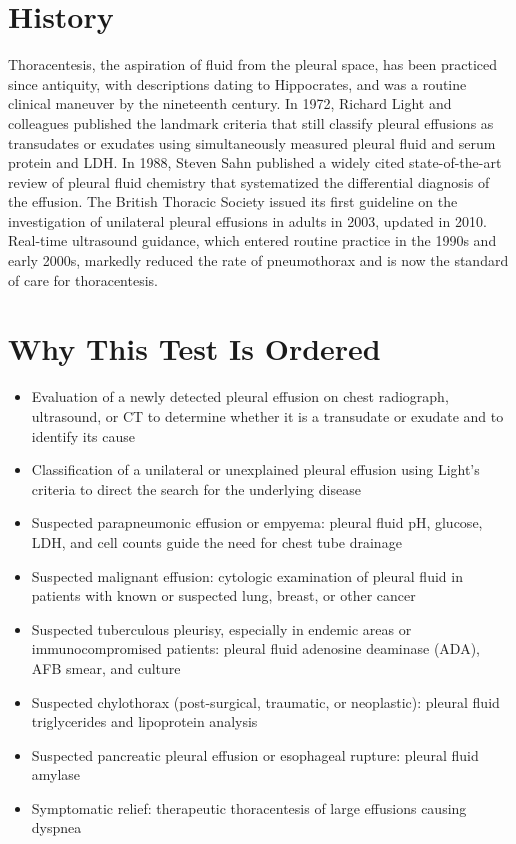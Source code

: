 \section*{History}
Thoracentesis, the aspiration of fluid from the pleural space, has been practiced since antiquity, with descriptions dating to Hippocrates, and was a routine clinical maneuver by the nineteenth century. In 1972, Richard Light and colleagues published the landmark criteria that still classify pleural effusions as transudates or exudates using simultaneously measured pleural fluid and serum protein and LDH. In 1988, Steven Sahn published a widely cited state-of-the-art review of pleural fluid chemistry that systematized the differential diagnosis of the effusion. The British Thoracic Society issued its first guideline on the investigation of unilateral pleural effusions in adults in 2003, updated in 2010. Real-time ultrasound guidance, which entered routine practice in the 1990s and early 2000s, markedly reduced the rate of pneumothorax and is now the standard of care for thoracentesis.
\section*{Why This Test Is Ordered}
\begin{itemize}
  \item Evaluation of a newly detected pleural effusion on chest radiograph, ultrasound, or CT to determine whether it is a transudate or exudate and to identify its cause
  \item Classification of a unilateral or unexplained pleural effusion using Light's criteria to direct the search for the underlying disease
  \item Suspected parapneumonic effusion or empyema: pleural fluid pH, glucose, LDH, and cell counts guide the need for chest tube drainage
  \item Suspected malignant effusion: cytologic examination of pleural fluid in patients with known or suspected lung, breast, or other cancer
  \item Suspected tuberculous pleurisy, especially in endemic areas or immunocompromised patients: pleural fluid adenosine deaminase (ADA), AFB smear, and culture
  \item Suspected chylothorax (post-surgical, traumatic, or neoplastic): pleural fluid triglycerides and lipoprotein analysis
  \item Suspected pancreatic pleural effusion or esophageal rupture: pleural fluid amylase
  \item Symptomatic relief: therapeutic thoracentesis of large effusions causing dyspnea
\end{itemize}
